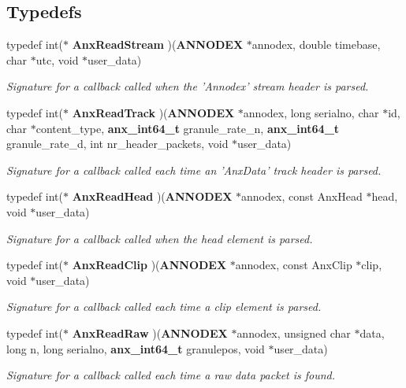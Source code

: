 \subsection*{Typedefs}
\begin{CompactItemize}
\item 
typedef int($\ast$ {\bf Anx\-Read\-Stream} )({\bf ANNODEX} $\ast$annodex, double timebase, char $\ast$utc, void $\ast$user\_\-data)
\begin{CompactList}\small\item\em Signature for a callback called when the 'Annodex' stream header is parsed. \item\end{CompactList}\item 
typedef int($\ast$ {\bf Anx\-Read\-Track} )({\bf ANNODEX} $\ast$annodex, long serialno, char $\ast$id, char $\ast$content\_\-type, {\bf anx\_\-int64\_\-t} granule\_\-rate\_\-n, {\bf anx\_\-int64\_\-t} granule\_\-rate\_\-d, int nr\_\-header\_\-packets, void $\ast$user\_\-data)
\begin{CompactList}\small\item\em Signature for a callback called each time an 'Anx\-Data' track header is parsed. \item\end{CompactList}\item 
typedef int($\ast$ {\bf Anx\-Read\-Head} )({\bf ANNODEX} $\ast$annodex, const Anx\-Head $\ast$head, void $\ast$user\_\-data)
\begin{CompactList}\small\item\em Signature for a callback called when the head element is parsed. \item\end{CompactList}\item 
typedef int($\ast$ {\bf Anx\-Read\-Clip} )({\bf ANNODEX} $\ast$annodex, const Anx\-Clip $\ast$clip, void $\ast$user\_\-data)
\begin{CompactList}\small\item\em Signature for a callback called each time a clip element is parsed. \item\end{CompactList}\item 
typedef int($\ast$ {\bf Anx\-Read\-Raw} )({\bf ANNODEX} $\ast$annodex, unsigned char $\ast$data, long n, long serialno, {\bf anx\_\-int64\_\-t} granulepos, void $\ast$user\_\-data)
\begin{CompactList}\small\item\em Signature for a callback called each time a raw data packet is found. \item\end{CompactList}\end{CompactItemize}
